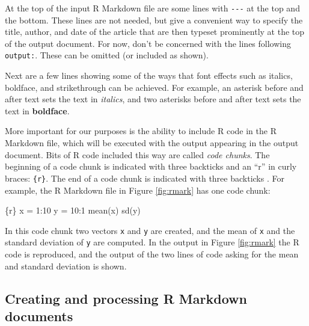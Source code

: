 \documentclass[
]{krantz}
\makeatletter
\newenvironment{Shaded}{\begin{snugshade}}{\end{snugshade}}
\newcommand{\DataTypeTok}[1]{\textcolor[rgb]{0.27,0.27,0.27}{#1}}
\newcommand{\StringTok}[1]{\textcolor[rgb]{0.5,0.5,0.5}{#1}}
\newenvironment{kframe}{%
\medskip{}
\setlength{\fboxsep}{.8em}
 \def\at@end@of@kframe{}%
 \ifinner\ifhmode%
  \def\at@end@of@kframe{\end{minipage}}%
  \begin{minipage}{\columnwidth}%
 \fi\fi%
 \def\FrameCommand##1{\hskip\@totalleftmargin \hskip-\fboxsep
 \colorbox{shadecolor}{##1}\hskip-\fboxsep
     \hskip-\linewidth \hskip-\@totalleftmargin \hskip\columnwidth}%
 \MakeFramed {\advance\hsize-\width
   \@totalleftmargin\z@ \linewidth\hsize
   \@setminipage}}%
 {\par\unskip\endMakeFramed%
 \at@end@of@kframe}
\renewenvironment{Shaded}{\begin{kframe}}{\end{kframe}}
\makeatother
\begin{document}
At the top of the input R Markdown file are some lines with \texttt{-\/-\/-} at the top and the bottom. These lines are not needed, but give a convenient way to specify the title, author, and date of the article that are then typeset prominently at the top of the output document. For now, don't be concerned with the lines following \texttt{output:}. These can be omitted (or included as shown).

Next are a few lines showing some of the ways that font effects such as italics, boldface, and strikethrough can be achieved. For example, an asterisk before and after text sets the text in \emph{italics}, and two asterisks before and after text sets the text in \textbf{boldface}.

More important for our purposes is the ability to include R code in the R Markdown file, which will be executed with the output appearing in the output document. Bits of R code included this way are called \emph{code chunks}. The beginning of a code chunk is indicated with three backticks and an ``r'' in curly braces: \texttt{\textasciigrave{}\textasciigrave{}\textasciigrave{}\{r\}}. The end of a code chunk is indicated with three backticks \texttt{\textasciigrave{}\textasciigrave{}\textasciigrave{}}. For example, the R Markdown file in Figure \ref{fig:rmark} has one code chunk:

\begin{Shaded}
\begin{Highlighting}[]
\StringTok{\textasciigrave{}\textasciigrave{}\textasciigrave{}}\DataTypeTok{\{r\}}
\DataTypeTok{x = 1:10}
\DataTypeTok{y = 10:1}
\DataTypeTok{mean(x)}
\DataTypeTok{sd(y)}
\StringTok{\textasciigrave{}\textasciigrave{}\textasciigrave{}}
\end{Highlighting}
\end{Shaded}

In this code chunk two vectors \texttt{x} and \texttt{y} are created, and the mean of \texttt{x} and the standard deviation of \texttt{y} are computed. In the output in Figure \ref{fig:rmark} the R code is reproduced, and the output of the two lines of code asking for the mean and standard deviation is shown.

\hypertarget{creating-and-processing-r-markdown-documents}{%
\subsection{Creating and processing R Markdown documents}\label{creating-and-processing-r-markdown-documents}}
\end{document}
